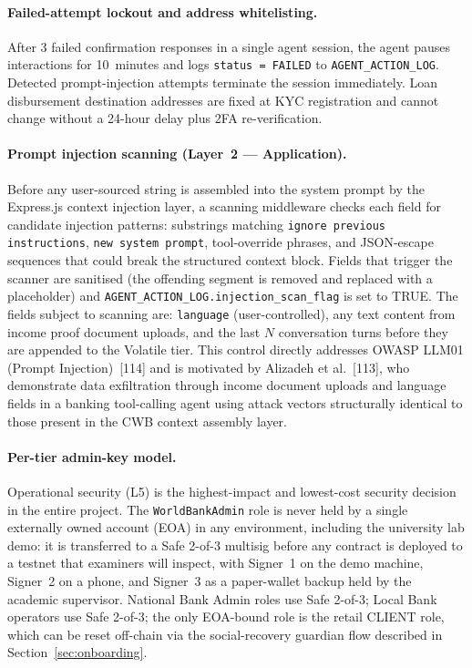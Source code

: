 \documentclass[12pt,a4paper]{report}
\begin{document}
\paragraph{Failed-attempt lockout and address whitelisting.}
After 3 failed confirmation responses in a single agent session, the agent pauses interactions for 10~minutes and logs \texttt{status = FAILED} to \texttt{AGENT\_ACTION\_LOG}. Detected prompt-injection attempts terminate the session immediately. Loan disbursement destination addresses are fixed at KYC registration and cannot change without a 24-hour delay plus 2FA re-verification.

\paragraph{Prompt injection scanning (Layer~2 --- Application).} Before any
user-sourced string is assembled into the system prompt by the Express.js context
injection layer, a scanning middleware checks each field for candidate injection
patterns: substrings matching \texttt{ignore previous instructions},
\texttt{new system prompt}, tool-override phrases, and JSON-escape sequences that
could break the structured context block. Fields that trigger the scanner are
sanitised (the offending segment is removed and replaced with a placeholder) and
\texttt{AGENT\_ACTION\_LOG.injection\_scan\_flag} is set to TRUE. The fields
subject to scanning are: \texttt{language} (user-controlled), any text content
from income proof document uploads, and the last $N$ conversation turns before
they are appended to the Volatile tier. This control directly addresses OWASP
LLM01 (Prompt Injection)~[114] and is motivated by Alizadeh et
al.~[113], who demonstrate data exfiltration through
income document uploads and language fields in a banking tool-calling agent using
attack vectors structurally identical to those present in the CWB context assembly
layer.

\paragraph{Per-tier admin-key model.}
Operational security (L5) is the highest-impact and lowest-cost security decision in the entire project. The \texttt{WorldBankAdmin} role is never held by a single externally owned account (EOA) in any environment, including the university lab demo: it is transferred to a Safe 2-of-3 multisig before any contract is deployed to a testnet that examiners will inspect, with Signer~1 on the demo machine, Signer~2 on a phone, and Signer~3 as a paper-wallet backup held by the academic supervisor. National Bank Admin roles use Safe 2-of-3; Local Bank operators use Safe 2-of-3; the only EOA-bound role is the retail CLIENT role, which can be reset off-chain via the social-recovery guardian flow described in Section~\ref{sec:onboarding}.
\end{document}
